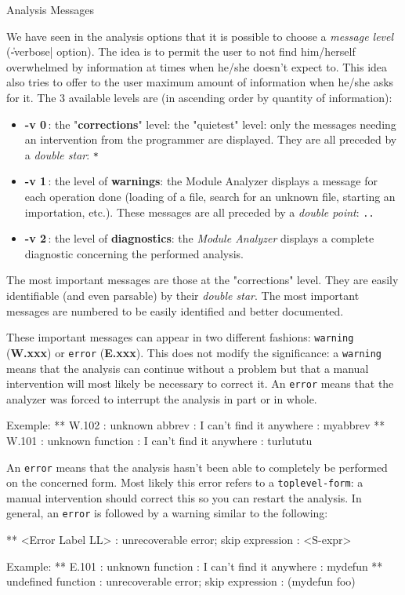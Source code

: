  {Analysis Messages}

We have seen in the analysis options that it is possible to choose a {\it message level} (\|-verbose| option).  The idea is to permit the user to not find him/herself overwhelmed by information at times when he/she doesn't expect to.  This idea also tries to offer to the user maximum amount of information when he/she asks for it.
The 3 available levels are (in ascending order by quantity of information):
\begin{itemize}
\item {\Large {\bf -v 0}}\,: the "{\bf corrections}" level:  the "quietest" level:  only the messages needing an intervention from the programmer are displayed.  They are all preceded by a {\em double star}:  {\tt **}
\item {\Large {\bf -v 1}}\,: the level of {\bf warnings}:  the Module Analyzer displays a message for each operation done (loading of a file, search for an unknown file, starting an importation, etc.).  These messages are all preceded by a {\em double point}:  {\tt ..}  
\item {\Large {\bf -v 2}}\,: the level of {\bf diagnostics}:  the {\em Module Analyzer} displays a complete diagnostic concerning the performed analysis.
\end{itemize}

The most important messages are those at the "corrections" level.  They are easily identifiable (and even parsable) by their {\em double star}.
The most important messages are numbered to be easily identified and better documented.

These important messages can appear in two different fashions:  {\tt warning} ({\bf W.xxx}) or {\tt error} ({\bf E.xxx}).  This does not modify the significance:  a {\tt warning} means that the analysis can continue without a problem but that a manual intervention will most likely be necessary to correct it.  An {\tt error} means that the analyzer was forced to interrupt the analysis in part or in whole.

\begin{Longcode*}
Exemple:
** W.102 : unknown abbrev : I can't find it anywhere : myabbrev
** W.101 : unknown function : I can't find it anywhere : turlututu
\end{Longcode*}

An {\tt error} means that the analysis hasn't been able to completely be performed on the concerned form.  Most likely this error refers to a {\tt toplevel-form}: a manual intervention should correct this so you can restart the analysis.  In general, an {\tt error} is followed by a warning similar to the following:  
\begin{Longcode*}
** <Error Label LL> : unrecoverable error; skip expression : <S-expr>

Example:
** E.101 : unknown function : I can't find it anywhere : mydefun
** undefined function : unrecoverable error; skip expression : (mydefun foo)
\end{Longcode*}

